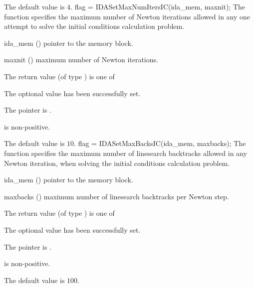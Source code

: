{{\begin{args}
  \end{args}
}
{
  The default value is $4$.
}
{
flag = IDASetMaxNumItersIC(ida\_mem, maxnit);
}
{
  The function  specifies the maximum
  number of Newton iterations allowed in any one attempt to solve
  the initial conditions calculation problem.
}
{
  \begin{args}
  \item[ida\_mem] ()
    pointer to the {\idas} memory block.
  \item[maxnit] ()
    maximum number of Newton iterations.
  \end{args}
}
{
  The return value  (of type ) is one of
  \begin{args}
  \item[\Id{IDA\_SUCCESS}]
    The optional value has been successfully set.
  \item[\Id{IDA\_MEM\_NULL}]
    The  pointer is .
  \item[\Id{IDA\_ILL\_INPUT}]
     is non-positive.
  \end{args}
}
{
  The default value is $10$.
}
{
flag = IDASetMaxBacksIC(ida\_mem, maxbacks);
}
{
  The function  specifies the maximum number
  of linesearch backtracks allowed in any Newton iteration, when solving
  the initial conditions calculation problem.
}
{
  \begin{args}
  \item[ida\_mem] ()
    pointer to the {\idas} memory block.
  \item[maxbacks] ()
    maximum number of linesearch backtracks per Newton step.
  \end{args}
}
{
  The return value  (of type ) is one of
  \begin{args}
  \item[\Id{IDA\_SUCCESS}]
    The optional value has been successfully set.
  \item[\Id{IDA\_MEM\_NULL}]
    The  pointer is .
  \item[\Id{IDA\_ILL\_INPUT}]
     is non-positive.
  \end{args}
}
{
  The default value is $100$.

}}
